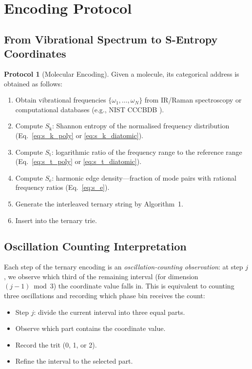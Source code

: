 \documentclass[11pt,twocolumn,a4paper]{article}
\theoremstyle{definition}
\newtheorem{protocol}[theorem]{Protocol}
\theoremstyle{remark}
\newcommand{\Sk}{S_{\mathrm{k}}}
\newcommand{\St}{S_{\mathrm{t}}}
\newcommand{\Se}{S_{\mathrm{e}}}
\begin{document}
\section{Encoding Protocol}
\label{sec:protocol}

\subsection{From Vibrational Spectrum to S-Entropy Coordinates}

\begin{protocol}[Molecular Encoding]
\label{prot:encoding}
Given a molecule, its categorical address is obtained as follows:
\begin{enumerate}[nosep]
\item Obtain vibrational frequencies $\{\omega_1, \ldots, \omega_N\}$ from IR/Raman spectroscopy or computational databases (e.g., NIST CCCBDB \citep{johnson2022}).
\item Compute $\Sk$: Shannon entropy of the normalised frequency distribution (Eq.~\ref{eq:s_k_poly} or \ref{eq:s_k_diatomic}).
\item Compute $\St$: logarithmic ratio of the frequency range to the reference range (Eq.~\ref{eq:s_t_poly} or \ref{eq:s_t_diatomic}).
\item Compute $\Se$: harmonic edge density---fraction of mode pairs with rational frequency ratios (Eq.~\ref{eq:s_e}).
\item Generate the interleaved ternary string by Algorithm~1.
\item Insert into the ternary trie.
\end{enumerate}
\end{protocol}

\subsection{Oscillation Counting Interpretation}

Each step of the ternary encoding is an \emph{oscillation-counting observation}: at step $j$, we observe which third of the remaining interval (for dimension $(j-1) \bmod 3$) the coordinate value falls in. This is equivalent to counting three oscillations and recording which phase bin receives the count:

\begin{itemize}[nosep]
\item Step $j$: divide the current interval into three equal parts.
\item Observe which part contains the coordinate value.
\item Record the trit (0, 1, or 2).
\item Refine the interval to the selected part.
\end{itemize}
\end{document}
